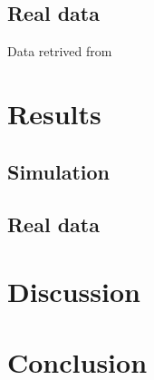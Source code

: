 \documentclass[aps,prd,twocolumn,superscriptaddress,preprintnumbers,nofootinbib,hidelinks]{revtex4-2}
\begin{document}
\subsection{Real data}
\label{sec:real-data-setup}
Data retrived from \citet{LIGOScientific:2019lzm, KAGRA:2023pio}

\section{Results}
\label{sec:results}

\subsection{Simulation}
\label{sec:injection-results}



\subsection{Real data}
\label{sec:real-data-results}



\section{Discussion}
\label{sec:discussion}



\section{Conclusion}
\label{sec:conclusion}
\end{document}
